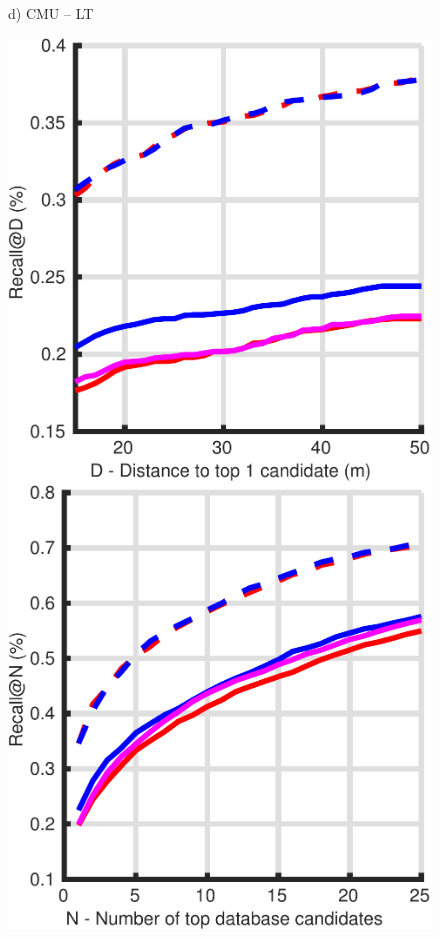 \begin{figure}
\begin{minipage}{0.27\linewidth}
		d) CMU -- LT
	\end{minipage}\hfill
	\begin{minipage}{0.27\linewidth}
		\center \scriptsize
		\includegraphics[width=\linewidth]{plot/oxf_cmu/Results_cmu_snow/distance}	
		
		\includegraphics[width=\linewidth]{plot/oxf_cmu/Results_cmu_snow/recall}
		

\end{minipage}
\end{figure}
